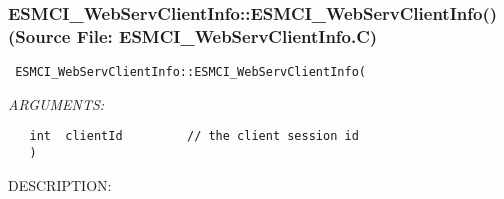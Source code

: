 
\setlength{\oldparskip}{\parskip}
\setlength{\parskip}{1.5ex}
\setlength{\oldparindent}{\parindent}
\setlength{\parindent}{0pt}
\setlength{\oldbaselineskip}{\baselineskip}
\setlength{\baselineskip}{11pt}
 
\def\bv{\begin{verbatim}}
\def\ev{\end{verbatim}}
\def\be{\begin{equation}}
\def\ee{\end{equation}}
\def\bea{\begin{eqnarray}}
\def\eea{\end{eqnarray}}
\def\bi{\begin{itemize}}
\def\ei{\end{itemize}}
\def\bn{\begin{enumerate}}
\def\en{\end{enumerate}}
\def\bd{\begin{description}}
\def\ed{\end{description}}
\def\({\left (}
\def\){\right )}
\def\[{\left [}
\def\]{\right ]}
\def\<{\left  \langle}
\def\>{\right \rangle}
\def\cI{{\cal I}}
\def\diag{\mathop{\rm diag}}
\def\tr{\mathop{\rm tr}}


 
\subsubsection{ESMCI\_WebServClientInfo::ESMCI\_WebServClientInfo() (Source File: ESMCI\_WebServClientInfo.C)}


  
\begin{verbatim} ESMCI_WebServClientInfo::ESMCI_WebServClientInfo(\end{verbatim}{\em ARGUMENTS:}
\begin{verbatim}   int  clientId         // the client session id
   )\end{verbatim}
{\sf DESCRIPTION:\\ }


